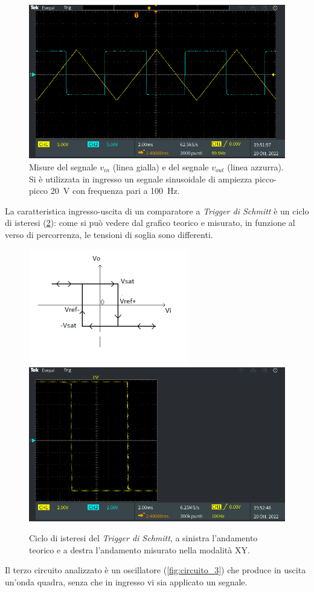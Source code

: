 \begin{figure}[tbh]
	\centering
	\includegraphics[width=\linewidth]{./ImageFiles/Laboratorio 3/TEK00007.PNG}
	\caption{Misure del segnale $v_{in}$ (linea gialla) e del segnale $v_{out}$ (linea azzurra). Si è utilizzata in ingresso un segnale sinusoidale di ampiezza picco-picco \SI{20}{\volt} con frequenza pari a \SI{100}{\hertz}.}
	\label{fig:uscita_circuito_2}
\end{figure}

\noindent
La caratteristica ingresso-uscita di un comparatore a \textit{Trigger di Schmitt} è un ciclo di isteresi (\Fig\ref{fig:ciclo_isteresi}): come si può vedere dal grafico teorico e misurato, in funzione al verso di percorrenza, le tensioni di soglia sono differenti. 
\begin{figure}[h!]
	\centering
	\includegraphics[width=0.4\linewidth]{./ImageFiles/Laboratorio 3/Ciclo di Isteresi.png}
	\includegraphics[width=0.5\linewidth]{./ImageFiles/Laboratorio 3/TEK00008.PNG}
	\caption{Ciclo di isteresi del \textit{Trigger di Schmitt}, a sinistra l'andamento teorico e a destra l'andamento misurato nella modalità XY.}
	\label{fig:ciclo_isteresi}
\end{figure} 
\clearpage 
Il terzo circuito analizzato è un oscillatore (\Fig\ref{fig:circuito_3}) che produce in uscita un'onda quadra, senza che in ingresso vi sia applicato un segnale.

